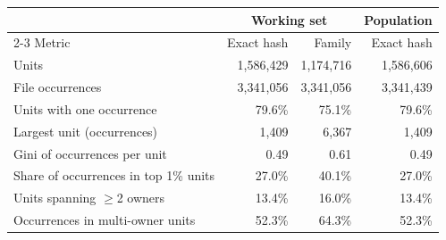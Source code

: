 \begin{tabular}{lrrr}
\toprule
 & \multicolumn{2}{c}{Working set} & Population \\
\cmidrule(lr){2-3}
Metric & Exact hash & Family & Exact hash \\
\midrule
Units & 1,586,429 & 1,174,716 & 1,586,606 \\
File occurrences & 3,341,056 & 3,341,056 & 3,341,439 \\
Units with one occurrence & 79.6\% & 75.1\% & 79.6\% \\
Largest unit (occurrences) & 1,409 & 6,367 & 1,409 \\
Gini of occurrences per unit & 0.49 & 0.61 & 0.49 \\
Share of occurrences in top 1\% units & 27.0\% & 40.1\% & 27.0\% \\
Units spanning $\geq$2 owners & 13.4\% & 16.0\% & 13.4\% \\
Occurrences in multi-owner units & 52.3\% & 64.3\% & 52.3\% \\
\bottomrule
\end{tabular}
